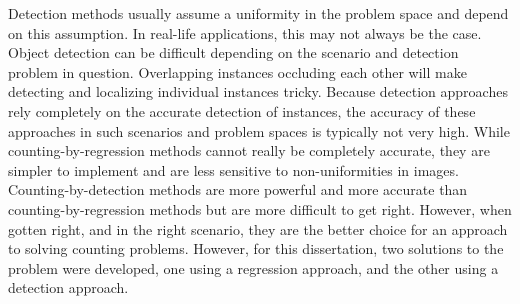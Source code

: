 Detection methods usually assume a uniformity in the problem space and depend on this assumption. In real-life applications, this may not always be the case. Object detection can be difficult depending on the scenario and detection problem in question. Overlapping instances occluding each other will make detecting and localizing individual instances tricky. Because detection approaches rely completely on the accurate detection of instances, the accuracy of these approaches in such scenarios and problem spaces is typically not very high. While counting-by-regression methods cannot really be completely accurate, they are simpler to implement and are less sensitive to non-uniformities in images. Counting-by-detection methods are more powerful and more accurate than counting-by-regression methods but are more difficult to get right. However, when gotten right, and in the right scenario, they are the better choice for an approach to solving counting problems. However, for this dissertation, two solutions to the problem were developed, one using a regression approach, and the other using a detection approach.
\bigskip

\goodbreak
